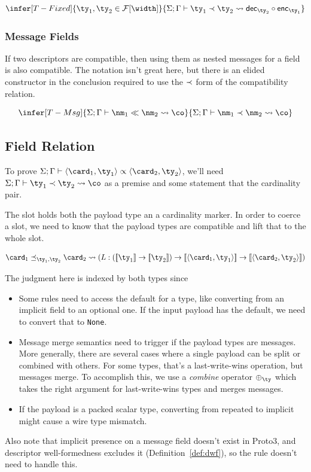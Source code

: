 \[
  \infer[T-Fixed]{ \ty_1, \ty_2 \in \mathcal{F}[\width]}{\judg{\Gamma}{\ty_1 \typrel \ty_2 \coerce
       \decop{\ty_2} \circ \encop{\ty_1}}}
\]

\subsubsection{Message Fields}

If two descriptors are compatible, then using them as nested messages for a
field is also compatible. The notation isn't great here, but there is an elided
constructor in the conclusion required to use the $\prec$ form of the
compatibility relation.

\[
  \infer[T-Msg]{\judg{\Gamma}{\nm_1 \dcompat \nm_2 \coerce \co}}{\judg{\Gamma}{\nm_1
      \typrel \nm_2 \coerce \co}}
\]

\subsection{Field Relation}

To prove
$\judg{\Gamma}{\field{\card_1}{\ty_1} \fieldrel \field{\card_2}{\ty_2}}$, we'll need
$\judg{\Gamma}{\ty_1 \typrel \ty_2 \coerce \co}$ as a premise and some statement that
the cardinality pair.

The slot holds both the payload type an a cardinality marker. In order to
coerce a slot, we need to know that the payload types are compatible and lift
that to the whole slot.

\[ \card_1 \cardrel{\ty_1}{\ty_2} \card_2 \coerce \left( L : \left(\denote{\ty_1} \to \denote{\ty_2}\right) \rightarrow
    \denote{\field{\card_1}{\ty_1}} \rightarrow \denote{\field{\card_2}{\ty_2}} \right) \]

The judgment here is indexed by both types since
\begin{itemize}
\item Some rules need to access the default for a type, like converting from an
  implicit field to an optional one. If the input payload has the default, we
  need to convert that to \texttt{None}.
\item Message merge semantics need to trigger if the payload types are
  messages. More generally, there are several cases where a single payload can
  be split or combined with others. For some types, that's a last-write-wins
  operation, but messages merge. To accomplish this, we use a \emph{combine}
  operator $\combine{\ty}$ which takes the right argument for last-write-wins types
  and merges messages.
\item If the payload is a packed scalar type, converting from repeated to
  implicit might cause a wire type mismatch.
\end{itemize}
Also note that implicit presence on a message field doesn't exist in Proto3, and
descriptor well-formedness excludes it (Definition~\ref{def:dwf}), so the rule
doesn't need to handle this.

